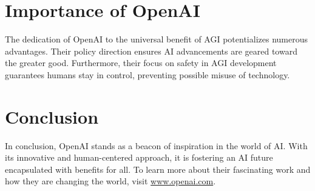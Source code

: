 \documentclass{article}
\begin{document}
\section{Importance of OpenAI}
The dedication of OpenAI to the universal benefit of AGI potentializes numerous advantages. Their policy direction ensures AI advancements are geared toward the greater good. Furthermore, their focus on safety in AGI development guarantees humans stay in control, preventing possible misuse of technology.

\section{Conclusion}
In conclusion, OpenAI stands as a beacon of inspiration in the world of AI. With its innovative and human-centered approach, it is fostering an AI future encapsulated with benefits for all. To learn more about their fascinating work and how they are changing the world, visit \href{https://openai.com}{www.openai.com}.
\end{document}
